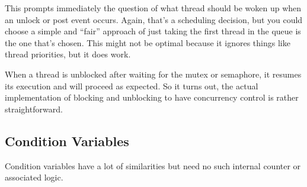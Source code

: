 This prompts immediately the question of what thread should be woken up when an unlock or post event occurs. Again, that's a scheduling decision, but you could choose a simple and ``fair'' approach of just taking the first thread in the queue is the one that's chosen. This might not be optimal because it ignores things like thread priorities, but it does work. 

When a thread is unblocked after waiting for the mutex or semaphore, it resumes its execution and will proceed as expected. So it turns out, the actual implementation of blocking and unblocking to have concurrency control is rather straightforward. 

\subsection*{Condition Variables}
Condition variables have a lot of similarities but need no such internal counter or associated logic.






